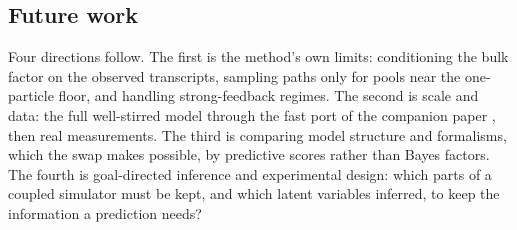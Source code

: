 \subsection{Future work}

Four directions follow. The first is the method's own limits: conditioning the bulk factor on the observed transcripts, sampling paths only for pools near the one-particle floor, and handling strong-feedback regimes. The second is scale and data: the full well-stirred
\syn{} model through the fast port of the companion paper \cite{kimpson2026whole}, then
real measurements. The third is comparing model structure and formalisms, which the swap
makes possible, by predictive scores rather than Bayes factors. The fourth is goal-directed
inference and experimental design: which parts of a coupled simulator must be kept, and
which latent variables inferred, to keep the information a prediction needs?
